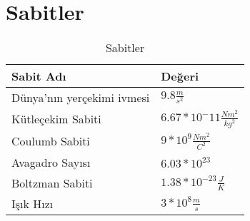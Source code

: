 \chapter{Sabitler}
\begin{table}[h!]
    \centering
    \caption{Sabitler}
    \vspace*{0.5cm}
    \begin{tabular}{| m{6cm} | m{6cm} |}
        \hline
        Sabit Adı & Değeri \\ \hline \hline
        Dünya'nın yerçekimi ivmesi & $9.8 \frac{m}{s^2}$ \\ \hline
        Kütleçekim Sabiti & $6.67 * 10^-11 \frac{N m^2}{kg^2}$ \\ \hline
        Coulumb Sabiti & $9* 10^9 \frac{N m^2}{C^2}$ \\ \hline
        Avagadro Sayısı & $6.03*10^{23}$ \\ \hline
        Boltzman Sabiti & $1.38*10^{-23} \frac{J}{K}$ \\ \hline
        Işık Hızı & $3*10^8 \frac{m}{s}$ \\ \hline
    \end{tabular}
\end{table}